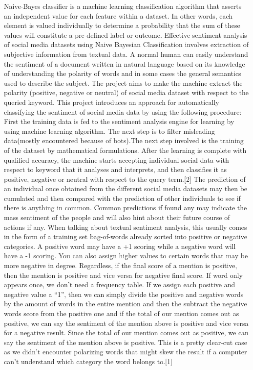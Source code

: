 \documentclass[aps,floatfix,prd,showpacs]{revtex4}
\begin{document}
Naive-Bayes classifier is a machine learning classification algorithm that asserts an independent value for each feature within a dataset. In other words, each element is valued individually to determine a probability that the sum of these values will constitute a pre-defined label or outcome. Effective sentiment analysis of social media datasets using Naive Bayesian Classification involves extraction of subjective information from textual data. A normal human can easily understand the sentiment of a document written in natural language based on its knowledge of understanding the polarity of words and in some cases the general semantics used to describe the subject. The project aims to make the machine extract the polarity (positive, negative or neutral) of social media dataset with respect to the queried keyword.
This project introduces an approach for automatically classifying the sentiment of social media data by using the following procedure: First the training data is fed to the sentiment analysis engine for learning by using machine learning algorithm. The next step is to filter misleading data(mostly encountered because of bots).The next step involved is the training of the dataset by mathematical formulations. After the learning is complete with qualified accuracy, the machine starts accepting individual social data with respect to keyword that it analyses and interprets, and then classifies it as positive, negative or neutral with respect to the query term.[2] The prediction of an individual once obtained from the different social media datasets may then be cumulated and then compared with the prediction of other individuals to see if there is anything in common. Common predictions if found any may indicate the mass sentiment of the people and will also hint about their future course of actions if any.
When talking about textual sentiment analysis, this usually comes in the form of a training set bag-of-words already sorted into positive or negative categories. A positive word may have a +1 scoring while a negative word will have a -1 scoring. You can also assign higher values to certain words that may be more negative in degree. Regardless, if the final score of a mention is positive, then the mention is positive and vice versa for negative final score.
If word only appears once, we don’t need a frequency table. If we assign each positive and negative value a “1”, then we can simply divide the positive and negative words by the amount of words in the entire mention and then the subtract the negative words score from the positive one and  if the total of our mention comes out as positive, we can say the sentiment of the mention above is positive and vice versa for a negative result.
Since the total of our mention comes out as positive, we can say the sentiment of the mention above is positive. This is a pretty clear-cut case as we didn’t encounter polarizing words that might skew the result if a computer can’t understand which category the word belongs to.[1] 
\end{document}
